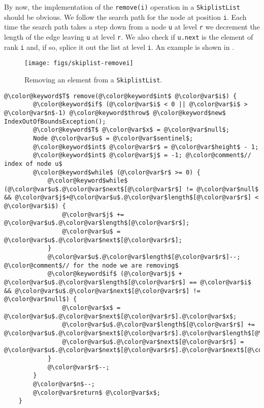 By now, the implementation of 
the \mbox{\texttt{remove({\color{var}i})}} operation in a \mbox{\texttt{SkiplistList}} should be obvious.  We follow the search path for the node at position \mbox{\texttt{{\color{var}i}}}.  Each time the search path takes a step down from a node \mbox{\texttt{{\color{var}u}}} at level \mbox{\texttt{{\color{var}r}}} we decrement the length of the edge leaving \mbox{\texttt{{\color{var}u}}} at level \mbox{\texttt{{\color{var}r}}}.  We also check if \mbox{\texttt{{\color{var}u}.{\color{var}next}}} is the element of rank \mbox{\texttt{{\color{var}i}}} and, if so, splice it out the list at level \mbox{\texttt{{\color{var}i}}}.   An example is shown in .
\begin{figure}
  \begin{center}
    \texttt{[image: figs/skiplist-removei]}
  \end{center}
  \caption{Removing an element from a \mbox{\texttt{SkiplistList}}.}
\end{figure}
\begin{Verbatim}[tabsize=2,frame=single,commandchars=\\@\$,label=\texttt{SkiplistList},labelposition=topline]
	@\color@keyword$T$ remove(@\color@keyword$int$ @\color@var$i$) {
		@\color@keyword$if$ (@\color@var$i$ < 0 || @\color@var$i$ > @\color@var$n$-1) @\color@keyword$throw$ @\color@keyword$new$ IndexOutOfBoundsException();
		@\color@keyword$T$ @\color@var$x$ = @\color@var$null$;
		Node @\color@var$u$ = @\color@var$sentinel$;
		@\color@keyword$int$ @\color@var$r$ = @\color@var$height$ - 1;
		@\color@keyword$int$ @\color@var$j$ = -1; @\color@comment$// index of node u$
		@\color@keyword$while$ (@\color@var$r$ >= 0) {
			@\color@keyword$while$ (@\color@var$u$.@\color@var$next$[@\color@var$r$] != @\color@var$null$ && @\color@var$j$+@\color@var$u$.@\color@var$length$[@\color@var$r$] < @\color@var$i$) {
				@\color@var$j$ += @\color@var$u$.@\color@var$length$[@\color@var$r$];
				@\color@var$u$ = @\color@var$u$.@\color@var$next$[@\color@var$r$];
			}
			@\color@var$u$.@\color@var$length$[@\color@var$r$]--;  @\color@comment$// for the node we are removing$
			@\color@keyword$if$ (@\color@var$j$ + @\color@var$u$.@\color@var$length$[@\color@var$r$] == @\color@var$i$ && @\color@var$u$.@\color@var$next$[@\color@var$r$] != @\color@var$null$) {
				@\color@var$x$ = @\color@var$u$.@\color@var$next$[@\color@var$r$].@\color@var$x$;
				@\color@var$u$.@\color@var$length$[@\color@var$r$] += @\color@var$u$.@\color@var$next$[@\color@var$r$].@\color@var$length$[@\color@var$r$];
				@\color@var$u$.@\color@var$next$[@\color@var$r$] = @\color@var$u$.@\color@var$next$[@\color@var$r$].@\color@var$next$[@\color@var$r$];
			}
			@\color@var$r$--;
		}
		@\color@var$n$--;
		@\color@var$return$ @\color@var$x$;
	}
\end{Verbatim}

